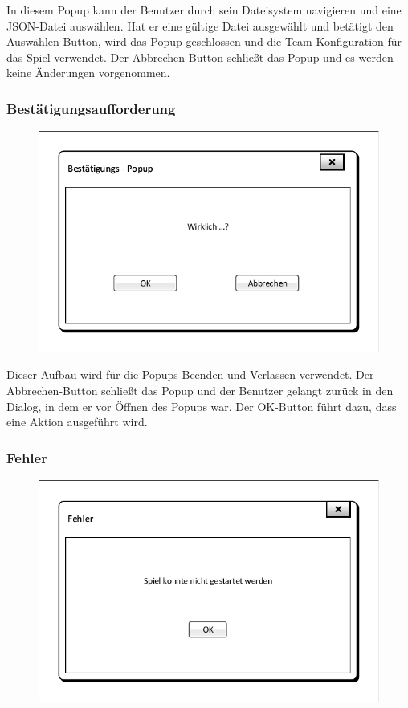In diesem Popup kann der Benutzer durch sein Dateisystem navigieren und eine JSON-Datei auswählen. Hat er eine gültige Datei ausgewählt und betätigt den \glqq{}Auswählen\grqq{}-Button, wird das Popup geschlossen und die Team-Konfiguration für das Spiel verwendet. Der \glqq{}Abbrechen\grqq{}-Button schließt das Popup und es werden keine Änderungen vorgenommen.

\subsubsection{Bestätigungsaufforderung}
\begin{figure}[H]
    \centering
    \includegraphics[scale=0.8]{images/OK_Popup.pdf}
\end{figure}

Dieser Aufbau wird für die Popups \glqq{}Beenden\grqq{} und \glqq{}Verlassen\grqq{} verwendet. Der \glqq{}Abbrechen\grqq{}-Button schließt das Popup und der Benutzer gelangt zurück in den Dialog, in dem er vor Öffnen des Popups war. Der \glqq{}OK\grqq{}-Button führt dazu, dass eine Aktion ausgeführt wird.

\subsubsection{Fehler}
\begin{figure}[H]
    \centering
    \includegraphics[scale=0.8]{images/Fehler_Popup.pdf}
\end{figure}

